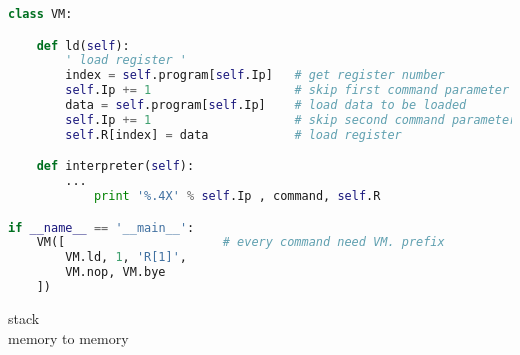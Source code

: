 \begin{lstlisting}[language=Python]
class VM:

    def ld(self):
        ' load register '
        index = self.program[self.Ip]   # get register number
        self.Ip += 1                    # skip first command parameter
        data = self.program[self.Ip]    # load data to be loaded
        self.Ip += 1                    # skip second command parameter
        self.R[index] = data            # load register

    def interpreter(self):
    	...
            print '%.4X' % self.Ip , command, self.R

if __name__ == '__main__':
    VM([                      # every command need VM. prefix
        VM.ld, 1, 'R[1]',
        VM.nop, VM.bye
    ])
\end{lstlisting}


\begin{description}
\item[stack]
\item[memory to memory]
\end{description}
